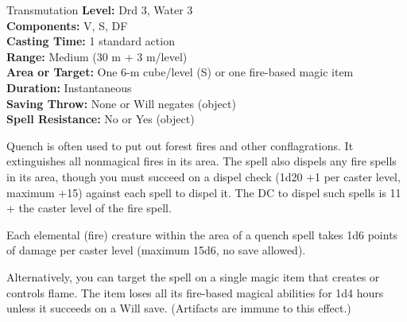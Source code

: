 {Transmutation}
{
	\textbf{Level:}
	Drd 3, Water 3\\
	\textbf{Components:}
	V, S, DF\\
	\textbf{Casting Time:}
	1 standard action\\
	\textbf{Range:}
	Medium (30 m + 3 m/level)\\
	\textbf{Area or Target:}
	One 6-m cube/level (S) or one fire-based magic item\\
	\textbf{Duration:}
	Instantaneous\\
	\textbf{Saving Throw:}
	None or Will negates (object)\\
	\textbf{Spell Resistance:}
	No or Yes (object)\\
}
{
	Quench is often used to put out forest fires and other conflagrations. It extinguishes all nonmagical fires in its area. The spell also dispels any fire spells in its area, though you must succeed on a dispel check (1d20 +1 per caster level, maximum +15) against each spell to dispel it. The DC to dispel such spells is 11 + the caster level of the fire spell.

	Each elemental (fire) creature within the area of a quench spell takes 1d6 points of damage per caster level (maximum 15d6, no save allowed).

	Alternatively, you can target the spell on a single magic item that creates or controls flame. The item loses all its fire-based magical abilities for 1d4 hours unless it succeeds on a Will save. (Artifacts are immune to this effect.)

}
